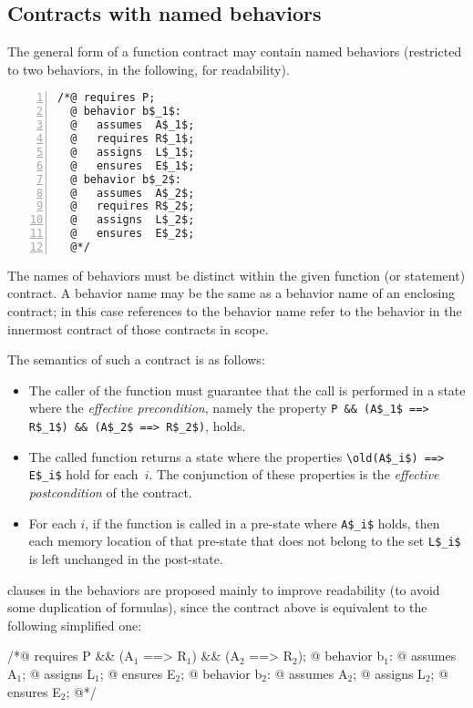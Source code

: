 \subsection{Contracts with named behaviors}
\label{subsec:behaviors}
The general form of a function contract may contain named
behaviors (restricted to two behaviors, in the following, for
readability).
\lstset{firstnumber=auto}
\begin{lstlisting}[style=c,basicstyle=\lp@basic,numbers=left,name=behaviors]
/*@ requires P;
  @ behavior b$_1$:
  @   assumes  A$_1$;
  @   requires R$_1$;
  @   assigns  L$_1$;
  @   ensures  E$_1$;
  @ behavior b$_2$:
  @   assumes  A$_2$;
  @   requires R$_2$;
  @   assigns  L$_2$;
  @   ensures  E$_2$;
  @*/
\end{lstlisting}
The names of behaviors must be distinct within the given function (or statement) contract. A behavior name may be the same as a behavior name
of an enclosing contract; in this case references to the behavior name
refer to the behavior in the innermost contract of those contracts in scope.

The semantics of such a contract is as follows:
\begin{itemize}
\item The caller of the function must guarantee that the call is
  performed in a state where the \emph{effective precondition}, namely the property
  \lstinline|P && (A$_1$ ==> R$_1$) && (A$_2$ ==> R$_2$)|, holds.
\item The called function returns a state where
the properties \lstinline|\old(A$_i$) ==> E$_i$| hold for each~$i$.
The conjunction of these properties is the \emph{effective postcondition} of the contract.
\item For each $i$, if the function is called in a pre-state where
  \lstinline|A$_i$| holds, then each memory location of that pre-state
  that does not belong to the set \lstinline|L$_i$| is left unchanged in
  the post-state.
\end{itemize}


\requires{} clauses in the behaviors are proposed
mainly to improve readability (to avoid some duplication of
formulas), since the contract above is equivalent to the following
simplified one:
\begin{listing}{1}
/*@ requires P && (A$_1$ ==> R$_1$) && (A$_2$ ==> R$_2$);
  @ behavior b$_1$:
  @   assumes A$_1$;
  @   assigns L$_1$;
  @   ensures E$_2$;
  @ behavior b$_2$:
  @   assumes A$_2$;
  @   assigns L$_2$;
  @   ensures E$_2$;
  @*/
\end{listing}

